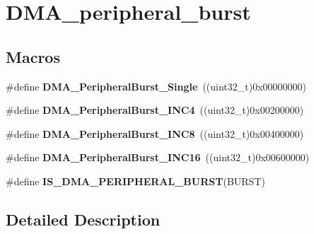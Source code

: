 \hypertarget{group___d_m_a__peripheral__burst}{\section{D\-M\-A\-\_\-peripheral\-\_\-burst}
\label{group___d_m_a__peripheral__burst}
}
\subsection*{Macros}
\begin{DoxyCompactItemize}
\item 
\hypertarget{group___d_m_a__peripheral__burst_ga524cdc5efb8978b586637f35e38a850b}{\#define {\bfseries D\-M\-A\-\_\-\-Peripheral\-Burst\-\_\-\-Single}~((uint32\-\_\-t)0x00000000)}\label{group___d_m_a__peripheral__burst_ga524cdc5efb8978b586637f35e38a850b}

\item 
\hypertarget{group___d_m_a__peripheral__burst_gaa8eba5161b3927f1ffb81157f3e39b71}{\#define {\bfseries D\-M\-A\-\_\-\-Peripheral\-Burst\-\_\-\-I\-N\-C4}~((uint32\-\_\-t)0x00200000)}\label{group___d_m_a__peripheral__burst_gaa8eba5161b3927f1ffb81157f3e39b71}

\item 
\hypertarget{group___d_m_a__peripheral__burst_gaf04ba122268e0f54085ca8e45410fe69}{\#define {\bfseries D\-M\-A\-\_\-\-Peripheral\-Burst\-\_\-\-I\-N\-C8}~((uint32\-\_\-t)0x00400000)}\label{group___d_m_a__peripheral__burst_gaf04ba122268e0f54085ca8e45410fe69}

\item 
\hypertarget{group___d_m_a__peripheral__burst_ga04ff56ff0a2a5470fc2c4817be4213c2}{\#define {\bfseries D\-M\-A\-\_\-\-Peripheral\-Burst\-\_\-\-I\-N\-C16}~((uint32\-\_\-t)0x00600000)}\label{group___d_m_a__peripheral__burst_ga04ff56ff0a2a5470fc2c4817be4213c2}

\item 
\#define {\bfseries I\-S\-\_\-\-D\-M\-A\-\_\-\-P\-E\-R\-I\-P\-H\-E\-R\-A\-L\-\_\-\-B\-U\-R\-S\-T}(B\-U\-R\-S\-T)
\end{DoxyCompactItemize}


\subsection{Detailed Description}


